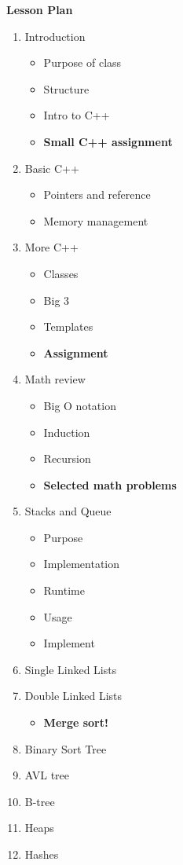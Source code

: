 \documentclass[a4paper]{article}
\begin{document}
\begin{center}

{\bf{\huge Lesson Plan}}\\
\end{center}
\begin{enumerate}
  \item Introduction
    \begin{itemize}
      \item Purpose of class
      \item Structure
      \item Intro to C++
      \item {\bf Small C++ assignment}
    \end{itemize}
  \item Basic C++
    \begin{itemize}
      \item Pointers and reference
      \item Memory management
    \end{itemize}
  \item More C++
    \begin{itemize}
      \item Classes
      \item Big 3
      \item Templates
      \item {\bf Assignment}
    \end{itemize}
  \item Math review 
    \begin{itemize}
      \item Big O notation
      \item Induction
      \item Recursion
      \item {\bf Selected math problems}
    \end{itemize}
  \item Stacks and Queue
    \begin{itemize}
      \item Purpose
      \item Implementation
      \item Runtime
      \item Usage
      \item Implement
    \end{itemize}
  \item Single Linked Lists
  \item Double Linked Lists
    \begin{itemize}
      \item {\bf Merge sort!}
    \end{itemize}
  \item Binary Sort Tree
  \item AVL tree
  \item B-tree
  \item Heaps
  \item Hashes
\end{enumerate}
\end{document}
